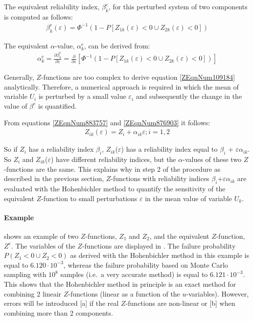 The equivalent reliability index, $\beta_k^e$, for this perturbed system of two components is computed as follows: 
\begin{align}
\beta _{k} ^{e} \left(\varepsilon \right)=\Phi ^{-1} \left(1-P\left[Z_{1k} \left(\varepsilon \right)<0\cup Z_{2k} \left(\varepsilon \right)<0\right]\right)\label{ZEqnNum789988} 
\end{align}

The equivalent $\alpha$-value, $\alpha_k^e$, can be derived from:
\begin{align}
\alpha _{k}^{e} =\frac{\partial \beta _{k} ^{e} }{\partial \varepsilon } =\frac{\partial }{\partial \varepsilon } \left[\Phi ^{-1} \left(1-P\left[Z_{1k} \left(\varepsilon \right)<0\cup Z_{2k} \left(\varepsilon \right)<0\right]\right)\right]\label{ZEqnNum109184} 
\end{align}

Generally, $Z$-functions are too complex to derive equation \eqref{ZEqnNum109184} analytically. Therefore, a numerical approach is required in which the mean of variable $U_i$ is perturbed by a small value $\varepsilon_i$ and subsequently the change in the value of $\beta^e$ is quantified.

From equations \eqref{ZEqnNum883757} and \eqref{ZEqnNum876903} it follows:
\begin{align}
Z_{ik} \left(\varepsilon \right)=Z_{i} +\alpha _{ik} \varepsilon     ;i=1,2\label{0.100)} 
\end{align}

So if $Z_i$ has a reliability index $\beta_i$, $Z_{ik}$($\varepsilon$) has a reliability index equal to $\beta_i$ + $\varepsilon$$\alpha_{ik}$. So $Z_i$ and $Z_{ik}$($\varepsilon$) have different reliability indices, but the $\alpha$-values of these two $Z$-functions are the same. This explains why in step 2 of the procedure as described in the previous section, $Z$-functions with reliability indices $\beta_i$+$\varepsilon$$\alpha_{ik}$ are evaluated with the Hohenbichler method to quantify the sensitivity of the equivalent $Z$-function to small perturbations $\varepsilon$ in the mean value of variable $U_k$. 

\paragraph*{Example}

 shows an example of two $Z$-functions, $Z_1$ and $Z_2$, and the equivalent $Z$-function, $Z^{e}$. The variables of the $Z$-functions are displayed in . The failure probability $P(Z_1<0\cup Z_2<0)$ as derived with the Hohenbichler method in this example is equal to $6.120 \cdot 10^{-3}$, whereas the failure probability based on Monte Carlo sampling with $10^{8}$ samples (i.e.\ a very accurate method) is equal to $6.121 \cdot 10^{-3}$. This shows that the Hohenbichler method in principle is an exact method for combining 2 lineair $Z$-functions (linear as a function of the $u$-variables). However, errors will be introduced [a] if the real $Z$-functions are non-linear or [b] when combining more than 2 components.

